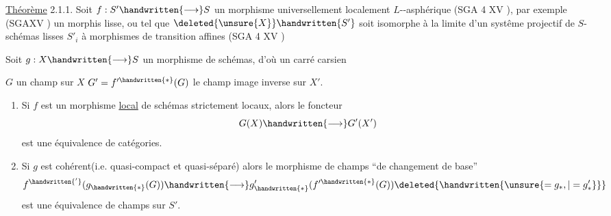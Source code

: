 \reversemarginpar
{}
\normalmarginpar
\uline{Théorème} 2.1.1. Soit $f:S'\handwritten{\longrightarrow}S$ un morphisme universellement localement \uline{$L$}--asphérique (SGA 4 XV ), par exemple (SGAXV ) un morphis lisse, ou tel que $\deleted{\unsure{X}}\handwritten{S'}$ soit isomorphe à la limite d'un systême projectif de $S$-schémas lisses $S'_i$ à morphismes de transition affines\deleted{\unsure{,}} (SGA 4 XV )

Soit $g:X\handwritten{\longrightarrow}S$ un morphisme de schémas, d'où un carré carsien

$G$ un champ sur $X$  $G'=f'^{\handwritten{*}}(G)$ le champ image inverse sur $X'$.

\begin{enumerate}[label=\alph*)]
\item Si  $f$ est un morphisme  \uline{local} de schémas strictement locaux, alors le foncteur
\[
G(X)\handwritten{\longrightarrow}G'(X')
\]
est une équivalence de catégories.

\item Si $g$ est cohérent(i.e. quasi-compact et quasi-séparé) alors le morphisme de champs ``de changement de base''
\[
f^{\handwritten{'}}(g_{\handwritten{*}}(G))\handwritten{\longrightarrow}g'_{\handwritten{*}}(f'^{\handwritten{*}}(G))\deleted{\handwritten{\unsure{=g_*,|=g_*'}}}
\]
est une équivalence de champs sur $S'$.
\end{enumerate}

